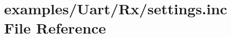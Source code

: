 \hypertarget{examples_2Uart_2Rx_2settings_8inc}{}\section{examples/\+Uart/\+Rx/settings.inc File Reference}
\label{examples_2Uart_2Rx_2settings_8inc}
